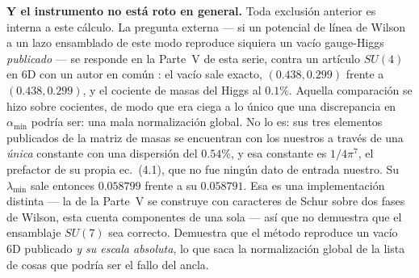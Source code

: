\documentclass[11pt,a4paper]{article}
\newcommand{\su}[1]{SU(#1)}
\newcommand{\amin}{\alpha_{\min}}
\begin{document}
\textbf{Y el instrumento no está roto en general.} Toda exclusión anterior es interna a este cálculo.
La pregunta externa --- si un potencial de línea de Wilson a un lazo ensamblado de este modo
reproduce siquiera un vacío gauge-Higgs \emph{publicado} --- se responde en la Parte~V de esta serie,
contra un artículo $\su4$ en 6D con un autor en común \cite{AHMN}: el vacío sale exacto,
$(0.438,0.299)$ frente a $(0.438,0.299)$, y el cociente de masas del Higgs al $0.1\%$. Aquella
comparación se hizo sobre cocientes, de modo que era ciega a lo único que una discrepancia en $\amin$
podría ser: una mala normalización global. No lo es: sus tres elementos publicados de la matriz de
masas se encuentran con los nuestros a través de una \emph{única} constante con una dispersión del
$0.54\%$, y esa constante es $1/4\pi^7$, el prefactor de su propia ec.~(4.1), que no fue ningún dato
de entrada nuestro. Su $\lambda_{\min}$ sale entonces $0.058799$ frente a su $0.058791$. Esa es una
implementación distinta --- la de la Parte~V se construye con caracteres de Schur sobre dos fases de
Wilson, esta cuenta componentes de una sola --- así que no demuestra que el ensamblaje $\su7$ sea
correcto. Demuestra que el método reproduce un vacío 6D publicado \emph{y su escala absoluta}, lo que
saca la normalización global de la lista de cosas que podría ser el fallo del ancla.
\end{document}
